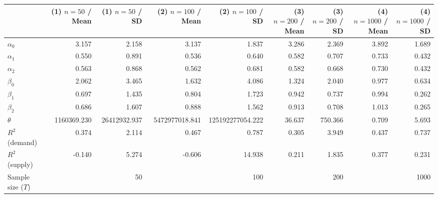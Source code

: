 
\begin{tabular}[t]{lrrrrrrrr}
\toprule
  & (1) $n=50$ / Mean & (1) $n=50$ / SD & (2) $n=100$ / Mean & (2) $n=100$ / SD & (3) $n=200$ / Mean & (3) $n=200$ / SD & (4) $n=1000$ / Mean & (4) $n=1000$ / SD\\
\midrule
$\alpha_{0}$ & 3.157 & 2.158 & 3.137 & 1.837 & 3.286 & 2.369 & 3.892 & 1.689\\
$\alpha_{1}$ & 0.550 & 0.891 & 0.536 & 0.640 & 0.582 & 0.707 & 0.733 & 0.432\\
$\alpha_{2}$ & 0.563 & 0.868 & 0.562 & 0.681 & 0.582 & 0.668 & 0.730 & 0.432\\
$\beta_{0}$ & 2.062 & 3.465 & 1.632 & 4.086 & 1.324 & 2.040 & 0.977 & 0.634\\
$\beta_{1}$ & 0.697 & 1.435 & 0.804 & 1.723 & 0.942 & 0.737 & 0.994 & 0.262\\
$\beta_{2}$ & 0.686 & 1.607 & 0.888 & 1.562 & 0.913 & 0.708 & 1.013 & 0.265\\
$\theta$ & 1160369.230 & 26412932.937 & 5472977018.841 & 125192277054.222 & 36.637 & 750.366 & 0.709 & 5.693\\
$R^{2}$ (demand) & 0.374 & 2.114 & 0.467 & 0.787 & 0.305 & 3.949 & 0.437 & 0.737\\
$R^{2}$ (supply) & -0.140 & 5.274 & -0.606 & 14.938 & 0.211 & 1.835 & 0.377 & 0.231\\
Sample size ($T$) &  & 50 &  & 100 &  & 200 &  & 1000\\
\bottomrule
\end{tabular}
